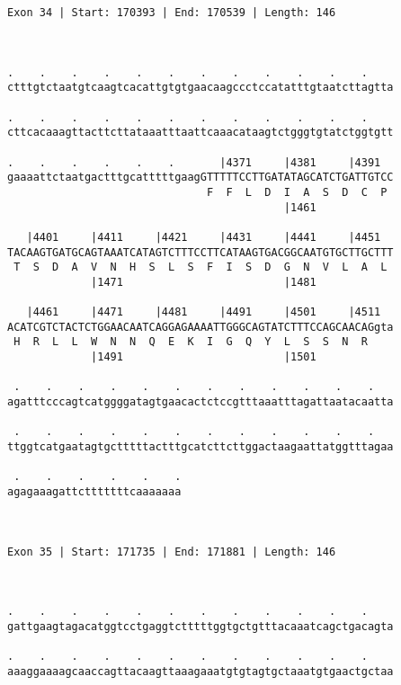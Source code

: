 \documentclass{article}
\begin{document}
\begin{Verbatim}
Exon 34 | Start: 170393 | End: 170539 | Length: 146



.    .    .    .    .    .    .    .    .    .    .    .    
ctttgtctaatgtcaagtcacattgtgtgaacaagccctccatatttgtaatcttagtta
                                                            
.    .    .    .    .    .    .    .    .    .    .    .    
cttcacaaagttacttcttataaatttaattcaaacataagtctgggtgtatctggtgtt
                                                            
.    .    .    .    .    .       |4371     |4381     |4391  
gaaaattctaatgactttgcatttttgaagGTTTTTCCTTGATATAGCATCTGATTGTCC
                               F  F  L  D  I  A  S  D  C  P 
                                           |1461            
  
   |4401     |4411     |4421     |4431     |4441     |4451  
TACAAGTGATGCAGTAAATCATAGTCTTTCCTTCATAAGTGACGGCAATGTGCTTGCTTT
 T  S  D  A  V  N  H  S  L  S  F  I  S  D  G  N  V  L  A  L 
             |1471                         |1481            
  
   |4461     |4471     |4481     |4491     |4501     |4511  
ACATCGTCTACTCTGGAACAATCAGGAGAAAATTGGGCAGTATCTTTCCAGCAACAGgta
 H  R  L  L  W  N  N  Q  E  K  I  G  Q  Y  L  S  S  N  R    
             |1491                         |1501            
  
 .    .    .    .    .    .    .    .    .    .    .    .   
agatttcccagtcatggggatagtgaacactctccgtttaaatttagattaatacaatta
                                                            
 .    .    .    .    .    .    .    .    .    .    .    .   
ttggtcatgaatagtgctttttactttgcatcttcttggactaagaattatggtttagaa
                                                            
 .    .    .    .    .    .
agagaaagattctttttttcaaaaaaa
                           
                           
 
Exon 35 | Start: 171735 | End: 171881 | Length: 146



.    .    .    .    .    .    .    .    .    .    .    .    
gattgaagtagacatggtcctgaggtctttttggtgctgtttacaaatcagctgacagta
                                                            
.    .    .    .    .    .    .    .    .    .    .    .    
aaaggaaaagcaaccagttacaagttaaagaaatgtgtagtgctaaatgtgaactgctaa
                                                            

\end{Verbatim}
\end{document}
